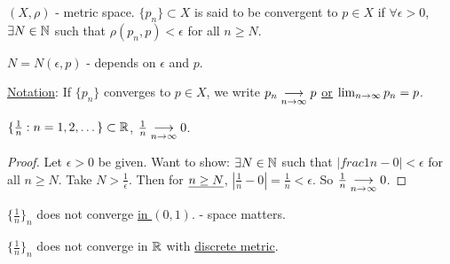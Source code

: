 \documentclass[]{article}
\begin{document}
\begin{definition}
	 $(X,\rho)$ - metric space.
	$\{p_n\}\subset X$ is said to be convergent to $p\in X$ if $\forall \epsilon >0$, $\exists N\in\mathbb{N}$ such that $\rho(p_n,p)<\epsilon$ for all $n\geq N$.
\end{definition}
\begin{note}
	$N = N(\epsilon,p)$ - depends on $\epsilon$ and $p$.
\end{note}
\ul{Notation}: If $\{p_n\}$ converges to $p\in X$, we write $p_n\underset{n\rightarrow\infty}{\longrightarrow}p$ \ul{\ul{or}} $\lim_{n\rightarrow\infty} p_n = p$.
\begin{example}
	$\{\frac{1}{n}:n=1,2,\dots\}\subset\mathbb{R}$, $\frac{1}{n}\underset{n\rightarrow\infty}{\longrightarrow}0$.
\end{example}
\begin{proof}
	Let $\epsilon>0$ be given. Want to show: $\exists N\in\mathbb{N}$ such that $|frac{1}{n} - 0|<\epsilon$ for all $n\geq N$.
	Take $N>\frac{1}{\epsilon}$. Then for $\underline{n\geq N}$, $|\frac{1}{n}-0| = \frac{1}{n} < \epsilon$. So $\frac{1}{n} \underset{n\rightarrow\infty}{\longrightarrow}0$.
\end{proof}
\begin{example}
	$\{\frac{1}{n}\}_n$ does not converge \ul{in $(0,1)$}. - space matters.
\end{example}
\begin{example}
	$\{\frac{1}{n}\}_n$ does not converge in $\mathbb{R}$ with \ul{discrete metric}.
\end{example}
\end{document}
